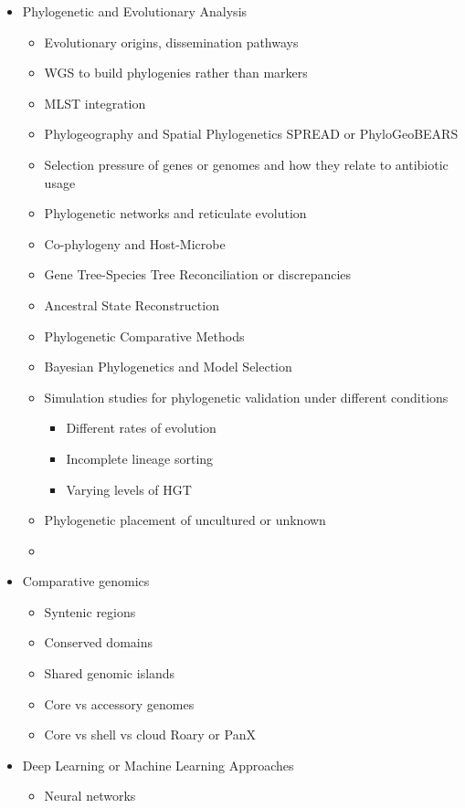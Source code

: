 \documentclass[11pt]{report}
\begin{document}
{\begin{itemize}
\begin{itemize}
	\item Phylogenetic and Evolutionary Analysis 
	\begin{itemize}
		\item Evolutionary origins, dissemination pathways
		\item WGS to build phylogenies rather than markers
		\item MLST integration 
		\item Phylogeography and Spatial Phylogenetics \dotfill SPREAD or PhyloGeoBEARS
		\item Selection pressure of genes or genomes and how they relate to antibiotic usage
		\item Phylogenetic networks and reticulate evolution
		\item Co-phylogeny and Host-Microbe 
		\item Gene Tree-Species Tree Reconciliation or discrepancies 
		\item Ancestral State Reconstruction 
		\item Phylogenetic Comparative Methods 
		\item Bayesian Phylogenetics and Model Selection
		\item Simulation studies for phylogenetic validation under different conditions
		\begin{itemize}
			\item Different rates of evolution
			\item Incomplete lineage sorting
			\item Varying levels of HGT
		\end{itemize}
		\item Phylogenetic placement of uncultured or unknown
		\item 
	\end{itemize} 
	\item Comparative genomics 
	\begin{itemize}
		\item Syntenic regions 
		\item Conserved domains
		\item Shared genomic islands
		\item Core vs accessory genomes
		\item Core vs shell vs cloud \dotfill Roary or PanX
	\end{itemize}
	\item Deep Learning or Machine Learning Approaches
	\begin{itemize}
		\item Neural networks

\end{itemize}
\end{itemize}
\end{itemize}}
\end{document}
